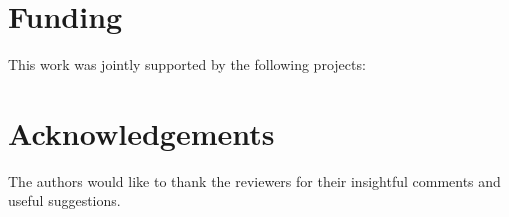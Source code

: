 \documentclass[a4paper,fleqn]{cas-dc}
\begin{document}
\begin{sloppypar}
	\section*{Funding}
	\par{This work was jointly supported by the following projects: }

	\section*{Acknowledgements}
	\par{The authors would like to thank the reviewers for their insightful comments and useful suggestions.}



	

	




\end{sloppypar}
\end{document}
